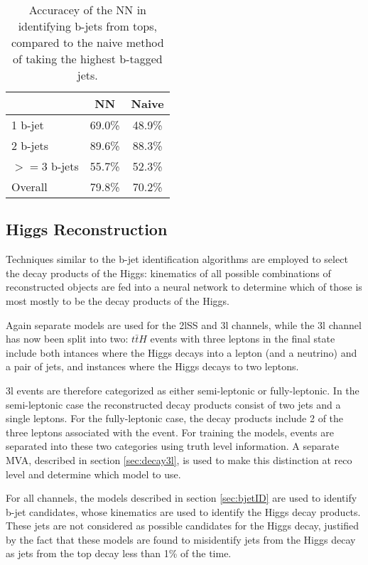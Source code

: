 \begin{table}[h!]
\centering
\caption{Accuracey of the NN in identifying b-jets from tops, compared to the naive method of taking the highest b-tagged jets.}
\begin{tabular}{l|c|c}
\hline\hline
& NN & Naive \\
\hline
1 b-jet    & 69.0\% & 48.9\% \\
2 b-jets   & 89.6\% & 88.3\% \\
$>=$3 b-jets & 55.7\% & 52.3\% \\
\hline
Overall & 79.8\% & 70.2\% \\
\hline\hline
\end{tabular}
\label{tab:topMatchAcc3l}
\end{table}


\subsection{Higgs Reconstruction}
\label{sec:higgsID}

Techniques similar to the b-jet identification algorithms are employed to select the decay products of the Higgs: kinematics of all possible combinations of reconstructed objects are fed into a neural network to determine which of those is most mostly to be the decay products of the Higgs.

Again separate models are used for the 2lSS and 3l channels, while the 3l channel has now been split into two: $t\bar{t}H$ events with three leptons in the final state include both intances where the Higgs decays into a lepton (and a neutrino) and a pair of jets, and instances where the Higgs decays to two leptons.

3l events are therefore categorized as either semi-leptonic or fully-leptonic. In the semi-leptonic case the reconstructed decay products consist of two jets and a single leptons. For the fully-leptonic case, the decay products include 2 of the three leptons associated with the event. For training the models, events are separated into these two categories using truth level information. A separate MVA, described in section \ref{sec:decay3l}, is used to make this distinction at reco level and determine which model to use.

For all channels, the models described in section \ref{sec:bjetID} are used to identify b-jet candidates, whose kinematics are used to identify the Higgs decay products. These jets are not considered as possible candidates for the Higgs decay, justified by the fact that these models are found to misidentify jets from the Higgs decay as jets from the top decay less than 1\% of the time.

